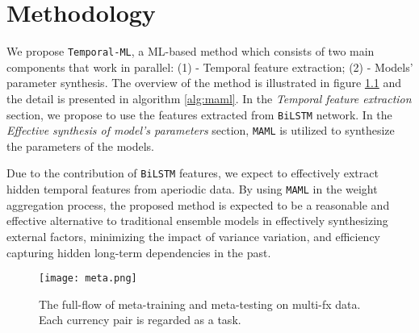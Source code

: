 
\chapter{Methodology}
\label{chap:method}


We propose \verb|Temporal-ML|, a ML-based method which consists of two main components that work in parallel: (1) - Temporal feature extraction; (2) - Models' parameter synthesis. The overview of the method is illustrated in figure \ref{fig:flow} and the detail is presented in algorithm \ref{alg:maml}. In the \textit{Temporal feature extraction} section, we propose to use the features extracted from \verb|BiLSTM| network. In the \textit{Effective synthesis of model's parameters} section, \verb|MAML| is utilized to synthesize the parameters of the models.

Due to the contribution of \verb|BiLSTM| features, we expect to effectively extract hidden temporal features from aperiodic data. By using \verb|MAML| in the weight aggregation process, the proposed method is expected to be a reasonable and effective alternative to traditional ensemble models in effectively synthesizing external factors, minimizing the impact of variance variation, and efficiency capturing hidden long-term dependencies in the past.

\begin{figure}[H]
    \centering
    \texttt{[image: meta.png]}
    \caption{The full-flow of meta-training and meta-testing on multi-fx data. Each currency pair is regarded as a task.}
    \label{fig:flow}
\end{figure}

